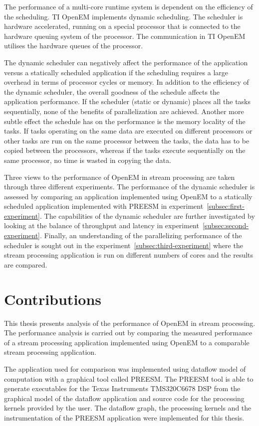 The performance of a multi-core runtime system is dependent on the efficiency of the scheduling. TI OpenEM implements dynamic scheduling. The scheduler is hardware accelerated, running on a special processor that is connected to the hardware queuing system of the processor. The communication in TI OpenEM utilises the hardware queues of the processor.

The dynamic scheduler can negatively affect the performance of the application versus a statically scheduled application if the scheduling requires a large overhead in terms of processor cycles or memory. In addition to the efficiency of the dynamic scheduler, the overall goodness of the schedule affects the application performance. If the scheduler (static or dynamic) places all the tasks sequentially, none of the benefits of parallelization are achieved. Another more subtle effect the schedule has on the performance is the memory locality of the tasks. If tasks operating on the same data are executed on different processors or other tasks are run on the same processor between the tasks, the data has to be copied between the processors, whereas if the tasks execute sequentially on the same processor, no time is wasted in copying the data.

Three views to the performance of OpenEM in stream processing are taken through three different experiments. The performance of the dynamic scheduler is assessed by comparing an application implemented using OpenEM to a statically scheduled application implemented with PREESM in experiment~\ref{subsec:first-experiment}. The capabilities of the dynamic scheduler are further investigated by looking at the balance of throughput and latency in experiment~\ref{subsec:second-experiment}. Finally, an understanding of the parallelizing performance of the scheduler is sought out in the experiment~\ref{subsec:third-experiment} where the stream processing application is run on different numbers of cores and the results are compared.

\section{Contributions}
\label{section:contributions}
This thesis presents analysis of the performance of OpenEM in stream processing. The performance analysis is carried out by comparing the measured performance of a stream processing application implemented using OpenEM to a comparable stream processing application.

The application used for comparison was implemented using dataflow model of computation with a graphical tool called PREESM. The PREESM tool is able to generate executables for the Texas Instruments TMS320C6678 DSP from the graphical model of the dataflow application and source code for the processing kernels provided by the user. The dataflow graph, the processing kernels and the instrumentation of the PREESM application were implemented for this thesis.

